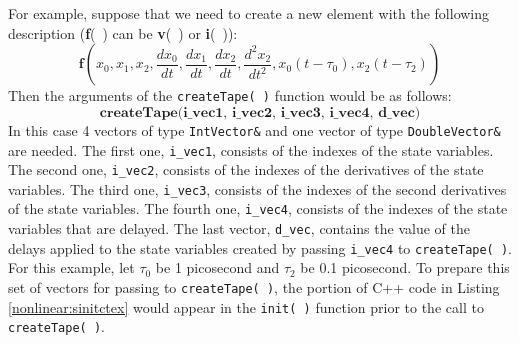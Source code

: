 For example, suppose that we need to create a new \FDA element
with the following description (\textbf{f}(~) can be \textbf{v}(~)
or \textbf{i}(~)):
\newline
\newline
\[\textbf{f}(x_0, x_1, x_2, \frac{dx_0}{dt}, \frac{dx_1}{dt}, \frac{dx_2}{dt},
    \frac{d^2x_2}{dt^2}, x_0(t-\tau_0), x_2(t-\tau_2))\]
\newline
Then the arguments of the \texttt{createTape(~)} function would be as
follows:
\newline
\[\textbf{createTape(i\_vec1, i\_vec2, i\_vec3, i\_vec4, d\_vec)}\]
\newline
In this case 4 vectors of type \texttt{IntVector\&} and one vector of type
\texttt{DoubleVector\&} are needed. The first one, \texttt{i\_vec1}, consists of the
indexes of the state variables. The second one, \texttt{i\_vec2}, consists
of the indexes of the derivatives of the state variables. The
third one, \texttt{i\_vec3}, consists of the indexes of the second derivatives
of the state variables. The fourth one, \texttt{i\_vec4}, consists of the
indexes of the state variables that are delayed.  The last vector,
\texttt{d\_vec}, contains the value of the delays applied to the state
variables created by passing \texttt{i\_vec4} to \texttt{createTape(~)}.
For this example, let $\tau_0$ be 1 picosecond and $\tau_2$ be 0.1 picosecond.
To prepare this set of vectors for passing to \texttt{createTape(~)},
the portion of C++ code in Listing \ref{nonlinear:sinitctex}
would appear in the \texttt{init(~)} function prior to the call
to \texttt{createTape(~)}.

